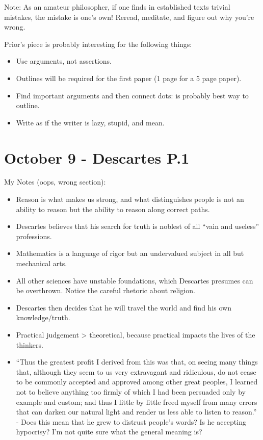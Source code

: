 \documentclass{report}
\begin{document}
Note: As an amateur philosopher, if one finds in established texts trivial mistakes, the mistake is one's own! Reread, meditate, and figure out why you're wrong.

Prior's piece is probably interesting for the following things:

\begin{itemize}
\item Use arguments, not assertions.
\item Outlines will be required for the first paper (1 page for a 5 page paper).
\item Find important arguments and then connect dots: is probably best way to outline.
\item Write as if the writer is lazy, stupid, and mean.
\end{itemize}

\section{October 9 - Descartes P.1}

My Notes (oops, wrong section):
\begin{itemize}
\item Reason is what makes us strong, and what distinguishes people is not an ability to reason but the ability to reason along correct paths.
\item Descartes believes that his search for truth is noblest of all "`vain and useless"' professions.
\item Mathematics is a language of rigor but an undervalued subject in all but mechanical arts.
\item All other sciences have unstable foundations, which Descartes presumes can be overthrown. Notice the careful rhetoric about religion.
\item Descartes then decides that he will travel the world and find his own knowledge/truth.
\item Practical judgement > theoretical, because practical impacts the lives of the thinkers.
\item "`Thus the greatest profit I derived from this was that, on seeing many things that, although they seem to us very extravagant and ridiculous, do not cease to be commonly accepted and approved among other great peoples, I learned not to believe anything too firmly of which I had been persuaded only by example and custom; and thus I little by little freed myself from many errors that can darken our natural light and render us less able to listen to reason."' - Does this mean that he grew to distrust people's words? Is he accepting hypocrisy? I'm not quite sure what the general meaning is?
\end{itemize}
\end{document}
